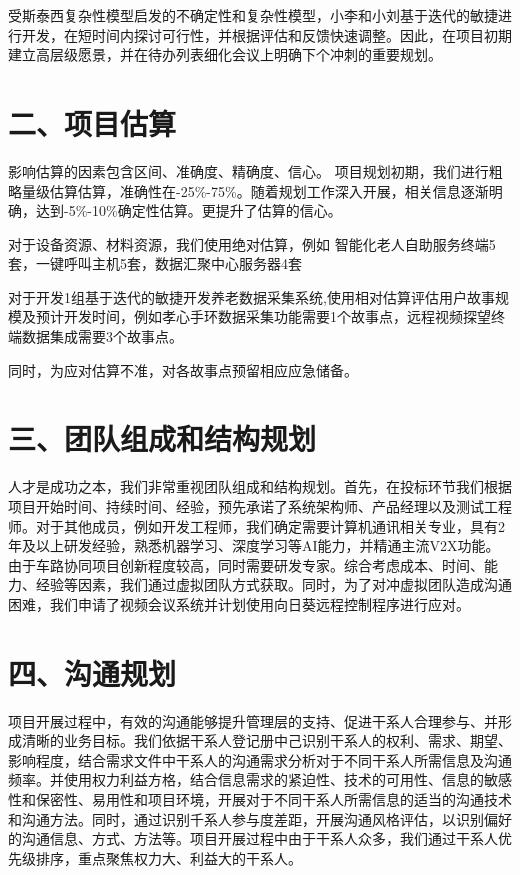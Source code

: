 \documentclass[UTF8]{../computerUniverse}
\begin{document}
受斯泰西复杂性模型启发的不确定性和复杂性模型，小李和小刘基于迭代的敏捷进行开发，在短时间内探讨可行性，并根据评估和反馈快速调整。因此，在项目初期建立高层级愿景，并在待办列表细化会议上明确下个冲刺的重要规划。


\section{二、项目估算}


影响估算的因素包含区间、准确度、精确度、信心。
项目规划初期，我们进行粗略量级估算估算，准确性在-25\%-75\%。随着规划工作深入开展，相关信息逐渐明确，达到-5\%-10\%确定性估算。更提升了估算的信心。

对于设备资源、材料资源，我们使用绝对估算，例如
智能化老人自助服务终端5套，一键呼叫主机5套，数据汇聚中心服务器4套

对于开发1组基于迭代的敏捷开发养老数据采集系统,使用相对估算评估用户故事规模及预计开发时间，例如孝心手环数据采集功能需要1个故事点，远程视频探望终端数据集成需要3个故事点。

同时，为应对估算不准，对各故事点预留相应应急储备。


\section{三、团队组成和结构规划}

人才是成功之本，我们非常重视团队组成和结构规划。首先，在投标环节我们根据项目开始时间、持续时间、经验，预先承诺了系统架构师、产品经理以及测试工程师。对于其他成员，例如开发工程师，我们确定需要计算机通讯相关专业，具有2年及以上研发经验，熟悉机器学习、深度学习等AI能力，并精通主流V2X功能。由于车路协同项目创新程度较高，同时需要研发专家。综合考虑成本、时间、能力、经验等因素，我们通过虚拟团队方式获取。同时，为了对冲虚拟团队造成沟通困难，我们申请了视频会议系统并计划使用向日葵远程控制程序进行应对。


\section{四、沟通规划}


项目开展过程中，有效的沟通能够提升管理层的支持、促进干系人合理参与、并形成清晰的业务目标。我们依据干系人登记册中己识别干系人的权利、需求、期望、影响程度，结合需求文件中干系人的沟通需求分析对于不同干系人所需信息及沟通频率。并使用权力利益方格，结合信息需求的紧迫性、技术的可用性、信息的敏感性和保密性、易用性和项目环境，开展对于不同干系人所需信息的适当的沟通技术和沟通方法。同时，通过识别千系人参与度差距，开展沟通风格评估，以识别偏好的沟通信息、方式、方法等。项目开展过程中由于干系人众多，我们通过干系人优先级排序，重点聚焦权力大、利益大的干系人。
\end{document}
